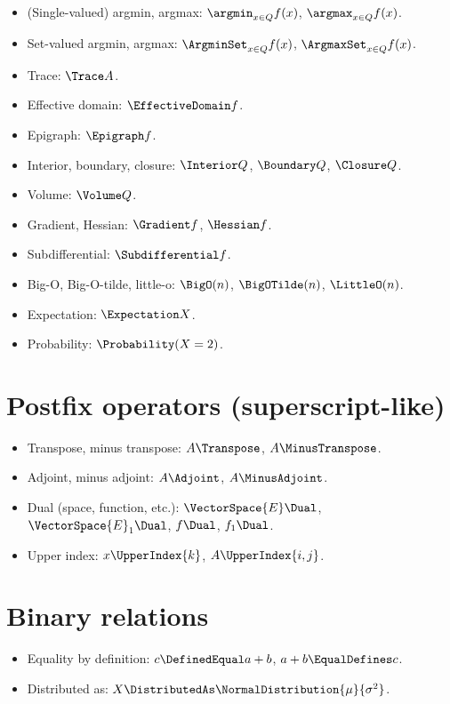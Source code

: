 \documentclass{article}
\begin{document}
  \begin{itemize}
    \item (Single-valued) argmin, argmax: $\argmin_{x \in Q} f(x)$, $\argmax_{x \in Q} f(x)$.
    \item Set-valued argmin, argmax: $\ArgminSet_{x \in Q} f(x)$, $\ArgmaxSet_{x \in Q} f(x)$.
    \item Trace: $\Trace A$.
    \item Effective domain: $\EffectiveDomain f$.
    \item Epigraph: $\Epigraph f$.
    \item Interior, boundary, closure: $\Interior Q$, $\Boundary Q$, $\Closure Q$.
    \item Volume: $\Volume Q$.
    \item Gradient, Hessian: $\Gradient f$, $\Hessian f$.
    \item Subdifferential: $\Subdifferential f$.
    \item Big-O, Big-O-tilde, little-o: $\BigO(n)$, $\BigOTilde(n)$, $\LittleO(n)$.
    \item Expectation: $\Expectation X$.
    \item Probability: $\Probability(X = 2)$.
  \end{itemize}

  \section{Postfix operators (superscript-like)}

  \begin{itemize}
    \item Transpose, minus transpose: $A\Transpose$, $A\MinusTranspose$.
    \item Adjoint, minus adjoint: $A\Adjoint$, $A\MinusAdjoint$.
    \item Dual (space, function, etc.): $\VectorSpace{E}\Dual$, $\VectorSpace{E}_1\Dual$, $f\Dual$, $f_1\Dual$.
    \item Upper index: $x\UpperIndex{k}$, $A\UpperIndex{i, j}$.
  \end{itemize}

  \section{Binary relations}

  \begin{itemize}
    \item Equality by definition: $c \DefinedEqual a + b$, $a + b \EqualDefines c$.
    \item Distributed as: $X \DistributedAs \NormalDistribution{\mu}{\sigma^2}$.
  \end{itemize}
\end{document}

